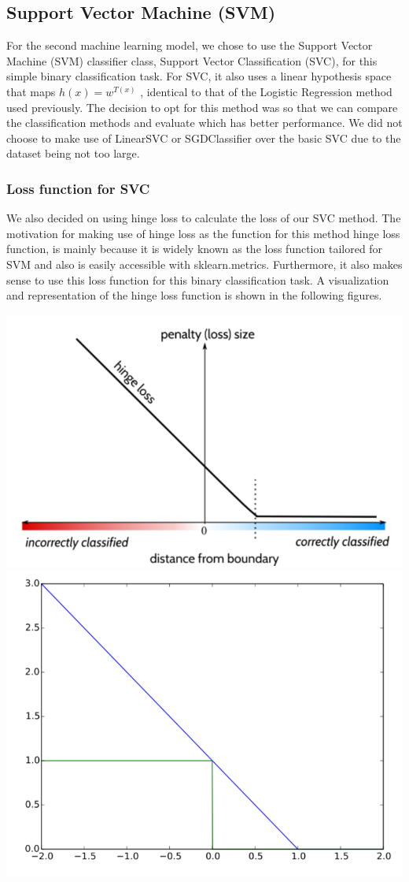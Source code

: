 \documentclass[a4paper,12pt]{article}
\begin{document}
\subsection{Support Vector Machine (SVM)}
\label{sec:orgae2c813}
For the second machine learning model, we chose to use the Support Vector Machine (SVM) classifier class, Support Vector Classification (SVC), for this simple binary classification task. For SVC, it also uses a linear hypothesis space that maps \(h(x) = w^{T(x)}\) , identical to that of the Logistic Regression method used previously. The decision to opt for this method was so that we can compare the classification methods and evaluate which has better performance. We did not choose to make use of LinearSVC or SGDClassifier over the basic SVC due to the dataset being not too large.
\subsubsection{Loss function for SVC}
\label{sec:orgc761f4d}

We also decided on using hinge loss to calculate the loss of our SVC method. The motivation for making use of hinge loss as the function for this method hinge loss function, is mainly because it is widely known as the loss function tailored for SVM and also is easily accessible with sklearn.metrics. Furthermore, it also makes sense to use this loss function for this binary classification task. A visualization and representation of the hinge loss function is shown in the following figures.



\includegraphics[height=0.3\textwidth]{./graphs/svc_1.png}
\includegraphics[height=0.3\textwidth]{./graphs/svc_2.png}
\end{document}
